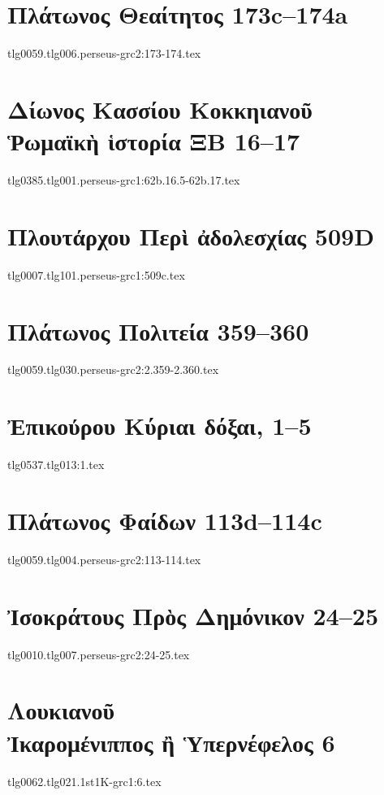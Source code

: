 \documentclass[a4paper,12pt,twoside]{report}
\begin{document}
\chapter[Πλάτωνος Θεαίτητος]{\textgreek[variant=ancient]{Πλάτωνος Θεαίτητος} 173c–174a}
{tlg0059.tlg006.perseus-grc2:173-174.tex}
\chapter[Δίωνος Κασσίου Ῥωμαϊκὴ ἱστορία ΞΒ 16–17]{\textgreek[variant=ancient]{Δίωνος Κασσίου Κοκκηιανοῦ \\Ῥωμαϊκὴ ἱστορία ΞΒ} 16–17}
{tlg0385.tlg001.perseus-grc1:62b.16.5-62b.17.tex}
\chapter[Πλουτάρχου Περὶ ἀδολεσχίας  509D]{\textgreek[variant=ancient]{Πλουτάρχου Περὶ ἀδολεσχίας} 509D}
{tlg0007.tlg101.perseus-grc1:509c.tex}
\chapter[Πλάτωνος Πολιτεία]{\textgreek[variant=ancient]{Πλάτωνος Πολιτεία} 359–360}
{tlg0059.tlg030.perseus-grc2:2.359-2.360.tex}
\chapter[Ἐπικούρου Κύριαι δόξαι]{\textgreek[variant=ancient]{Ἐπικούρου Κύριαι δόξαι,} 1–5}
{tlg0537.tlg013:1.tex}
\chapter[Πλάτωνος Φαίδων]{\textgreek[variant=ancient]{Πλάτωνος Φαίδων} 113d–114c}
{tlg0059.tlg004.perseus-grc2:113-114.tex}
\chapter[Ἰσοκράτους Πρὸς Δημόνικον]{\textgreek[variant=ancient]{Ἰσοκράτους Πρὸς Δημόνικον} 24–25}
{tlg0010.tlg007.perseus-grc2:24-25.tex}
\chapter[Λουκιανοῦ Ἰκαρομένιππος]{\textgreek[variant=ancient]{Λουκιανοῦ \\Ἰκαρομένιππος ἢ Ὑπερνέφελος} 6}
{tlg0062.tlg021.1st1K-grc1:6.tex}
\end{document}
